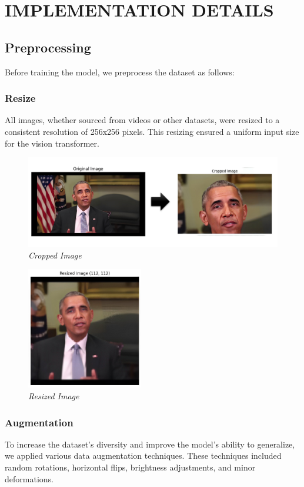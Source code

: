 \section{IMPLEMENTATION DETAILS}
\subsection{Preprocessing}

Before training the model, we preprocess the dataset as follows:

\subsubsection{Resize}
All images, whether sourced from videos or other datasets, were resized to a consistent resolution of 256x256 pixels. This resizing ensured a uniform input size for the vision transformer.

\begin{figure}[ht]
    \centering
    \includegraphics[width=5in]{img/cropped.jpg}
    \caption{\textit{Cropped Image}}
    \label{fig:cropped}
\end{figure}

\begin{figure}[ht]
    \centering
    \includegraphics[width=2in]{img/resized.jpg}
    \caption{\textit{Resized Image}}
    \label{fig:resized}
\end{figure}

\subsubsection{Augmentation} To increase the dataset's diversity and improve the model's ability to generalize, we applied various data augmentation techniques. These techniques included random rotations, horizontal flips, brightness adjustments, and minor deformations.
\newpage
